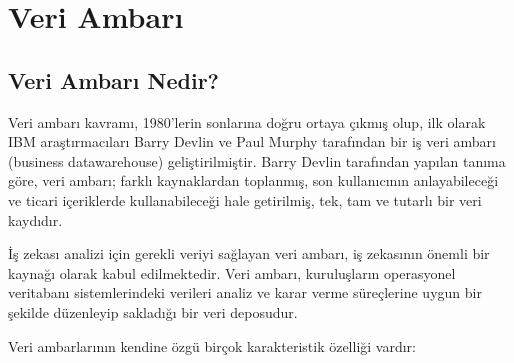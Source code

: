 \documentclass{article}
\begin{document}
\newpage

\section{Veri Ambarı}
\vspace{10pt}
\subsection{Veri Ambarı Nedir?}

\vspace{10pt}
Veri ambarı kavramı, 1980'lerin sonlarına doğru ortaya çıkmış olup, ilk olarak IBM araştırmacıları Barry Devlin ve Paul Murphy tarafından bir iş veri ambarı (business datawarehouse) geliştirilmiştir. Barry Devlin tarafından yapılan tanıma göre, veri ambarı; farklı kaynaklardan toplanmış, son kullanıcının anlayabileceği ve ticari içeriklerde kullanabileceği hale getirilmiş, tek, tam ve tutarlı bir veri kaydıdır.

\vspace{10pt}
İş zekası analizi için gerekli veriyi sağlayan veri ambarı, iş zekasının önemli bir kaynağı olarak kabul edilmektedir. Veri ambarı, kuruluşların operasyonel veritabanı sistemlerindeki verileri analiz ve karar verme süreçlerine uygun bir şekilde düzenleyip sakladığı bir veri deposudur.

\vspace{5pt}
Veri ambarlarının kendine özgü birçok karakteristik özelliği vardır:
\vspace{5pt}
\end{document}
